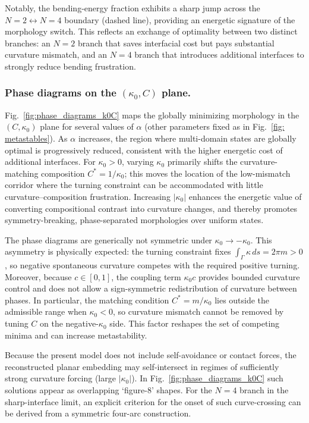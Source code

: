 \documentclass[
aip,
jcp,
reprint, 
floatfix
]{revtex4-1}
\begin{document}
Notably, the bending-energy fraction exhibits a sharp jump across the $N=2\leftrightarrow N=4$ boundary (dashed line), providing an energetic signature of the morphology switch. This reflects an exchange of optimality between two distinct branches: an $N=2$ branch that saves interfacial cost but pays substantial curvature mismatch, and an $N=4$ branch that introduces additional interfaces to strongly reduce bending frustration.

\subsubsection{Phase diagrams on the \texorpdfstring{$(\kappa_0, C)$}{(kappa_0, C)} plane.}

Fig.~\ref{fig:phase_diagrams_k0C} maps the globally minimizing morphology in the $(C,\kappa_0)$ plane for several values of $\alpha$ (other parameters fixed as in Fig.~\ref{fig: metastables}). As $\alpha$ increases, the region where multi-domain states are globally optimal is progressively reduced, consistent with the higher energetic cost of additional interfaces. For $\kappa_0>0$, varying $\kappa_0$ primarily shifts the curvature-matching composition $C^*=1/\kappa_0$; this moves the location of the low-mismatch corridor where the turning constraint can be accommodated with little curvature--composition frustration. Increasing $|\kappa_0|$ enhances the energetic value of converting compositional contrast into curvature changes, and thereby promotes symmetry-breaking, phase-separated morphologies over uniform states.

The phase diagrams are generically not symmetric under $\kappa_0\to-\kappa_0$. This asymmetry is physically expected: the turning constraint fixes $\int_\Gamma \kappa\,ds=2\pi m>0$, so negative spontaneous curvature competes with the required positive turning. Moreover, because $c\in[0,1]$, the coupling term $\kappa_0 c$ provides bounded curvature control and does not allow a sign-symmetric redistribution of curvature between phases. In particular, the matching condition $C^*=m/\kappa_0$ lies outside the admissible range when $\kappa_0<0$, so curvature mismatch cannot be removed by tuning $C$ on the negative-$\kappa_0$ side. This factor reshapes the set of competing minima and can increase metastability.

\FloatBarrier
Because the present model does not include self-avoidance or contact forces, the reconstructed planar embedding may self-intersect in regimes of sufficiently strong curvature forcing (large $|\kappa_0|$). In
Fig.~\ref{fig:phase_diagrams_k0C} such solutions appear as overlapping `figure-8' shapes. For the $N=4$ branch in the sharp-interface limit, an explicit criterion for the onset of such curve-crossing can be derived from a symmetric four-arc construction.
\end{document}

